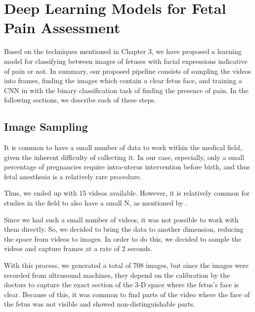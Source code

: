 \chapter{Deep Learning Models for Fetal Pain Assessment}



Based on the techniques mentioned in Chapter 3, we have proposed a learning model for classifying between images of fetuses with facial expressions indicative of pain or not. In summary, our proposed pipeline consists of sampling the videos into frames, finding the images which contain a clear fetus face, and training a CNN in with the binary classification task of finding the presence of pain. In the following sections, we describe each of these steps.

\section{Image Sampling}

It is common to have a small number of data to work within the medical field, given the inherent difficulty of collecting it. In our case, especially, only a small percentage of pregnancies require intra-uterus intervention before birth, and thus fetal anesthesia is a relatively rare procedure. 

Thus, we ended up with 15 videos available. However, it is relatively common for studies in the field to also have a small N, as mentioned by \cite{ZamzmiPGKSA16}.

Since we had such a small number of videos, it was not possible to work with them directly. So, we decided to bring the data to another dimension, reducing the space from videos to images. In order to do this, we decided to sample the videos and capture frames at a rate of 2 seconds. 

With this process, we generated a total of 708 images, but since the images were recorded from ultrasound machines, they depend on the calibration by the doctors to capture the exact section of the 3-D space where the fetus's face is clear. Because of this, it was common to find parts of the video where the face of the fetus was not visible and showed non-distinguishable parts.

